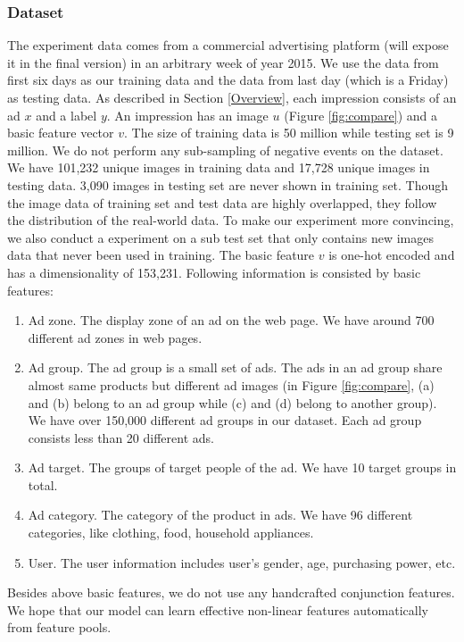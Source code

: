 \documentclass{sig-alternate}
\begin{document}
\subsubsection{Dataset}
The experiment data comes from a commercial advertising platform (will expose it in the final version) in an  arbitrary  week of year 2015. We use the data from first six days as our training data and the data from last day (which is a Friday) as testing data.  As described in Section \ref{Overview}, each impression consists of an ad $x$ and a label $y$.  An impression has an image $u$ (Figure \ref{fig:compare}) and a basic feature vector $v$.  The size of training data is 50 million while testing set is 9 million. We do not perform any sub-sampling of negative events on the dataset. We have 101,232 unique images in training data and 17,728 unique images in testing data. 3,090 images in testing set are never shown in training set. Though the image data of training set and test data are highly overlapped, they follow the distribution of the real-world data. To make our experiment more convincing, we also conduct a experiment on a sub test set that only contains new images data that never been used in training.  The basic feature $v$ is one-hot encoded and has a dimensionality of 153,231. Following information is consisted by basic features:
\begin{enumerate}
	\item Ad zone. The display zone of an ad on the web page. We have around 700 different ad zones in web pages.
	\item Ad group. The ad group is a small set of ads. The ads in an ad group share almost same  products but different ad images (in Figure \ref{fig:compare}, (a) and (b) belong to an ad group while (c) and (d) belong to another group). We have over 150,000 different ad groups in our dataset. Each ad group consists less than 20 different   ads.
	\item Ad target. The groups of target people of the ad.  We have 10 target groups in total.
	\item Ad category. The category of the product in ads. We have 96 different categories, like clothing, food, household appliances. 
	\item User. The user information includes user's gender, age, purchasing power, etc. 
\end{enumerate}
Besides above basic features, we do not use any handcrafted conjunction features. We hope that  our model can learn  effective non-linear features automatically from feature pools.
\end{document}
